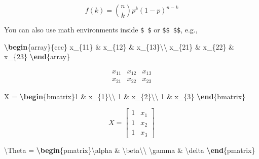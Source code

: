 \documentclass[
  12pt,
]{krantz}
\newenvironment{Shaded}{\begin{snugshade}}{\end{snugshade}}
\newcommand{\ExtensionTok}[1]{#1}
\newcommand{\KeywordTok}[1]{\textcolor[rgb]{0.13,0.29,0.53}{\textbf{#1}}}
\newcommand{\NormalTok}[1]{#1}
\newcommand{\SpecialCharTok}[1]{\textcolor[rgb]{0.00,0.00,0.00}{#1}}
\newcommand{\SpecialStringTok}[1]{\textcolor[rgb]{0.31,0.60,0.02}{#1}}
\theoremstyle{definition}
\theoremstyle{definition}
\theoremstyle{definition}
\theoremstyle{definition}
\theoremstyle{remark}
\begin{document}
\[f\left(k\right)=\binom{n}{k}p^k\left(1-p\right)^{n-k}\]

You can also use math environments inside \texttt{\$\ \$} or \texttt{\$\$\ \$\$}, e.g.,

\begin{Shaded}
\begin{Highlighting}[]
\SpecialStringTok{$$}\KeywordTok{\textbackslash{}begin}\NormalTok{\{}\ExtensionTok{array}\NormalTok{\}}\SpecialStringTok{\{ccc\}}
\SpecialStringTok{x\_\{11\} \& x\_\{12\} \& x\_\{13\}}\SpecialCharTok{\textbackslash{}\textbackslash{}}
\SpecialStringTok{x\_\{21\} \& x\_\{22\} \& x\_\{23\}}
\KeywordTok{\textbackslash{}end}\NormalTok{\{}\ExtensionTok{array}\NormalTok{\}}\SpecialStringTok{$$}
\end{Highlighting}
\end{Shaded}

\[\begin{array}{ccc}
x_{11} & x_{12} & x_{13}\\
x_{21} & x_{22} & x_{23}
\end{array}\]

\begin{Shaded}
\begin{Highlighting}[]
\SpecialStringTok{$$X = }\KeywordTok{\textbackslash{}begin}\NormalTok{\{}\ExtensionTok{bmatrix}\NormalTok{\}}\SpecialStringTok{1 \& x\_\{1\}}\SpecialCharTok{\textbackslash{}\textbackslash{}}
\SpecialStringTok{1 \& x\_\{2\}}\SpecialCharTok{\textbackslash{}\textbackslash{}}
\SpecialStringTok{1 \& x\_\{3\}}
\KeywordTok{\textbackslash{}end}\NormalTok{\{}\ExtensionTok{bmatrix}\NormalTok{\}}\SpecialStringTok{$$}
\end{Highlighting}
\end{Shaded}

\[X = \begin{bmatrix}1 & x_{1}\\
1 & x_{2}\\
1 & x_{3}
\end{bmatrix}\]

\begin{Shaded}
\begin{Highlighting}[]
\SpecialStringTok{$$}\SpecialCharTok{\textbackslash{}Theta}\SpecialStringTok{ = }\KeywordTok{\textbackslash{}begin}\NormalTok{\{}\ExtensionTok{pmatrix}\NormalTok{\}}\SpecialCharTok{\textbackslash{}alpha}\SpecialStringTok{ \& }\SpecialCharTok{\textbackslash{}beta\textbackslash{}\textbackslash{}}
\SpecialCharTok{\textbackslash{}gamma}\SpecialStringTok{ \& }\SpecialCharTok{\textbackslash{}delta}
\KeywordTok{\textbackslash{}end}\NormalTok{\{}\ExtensionTok{pmatrix}\NormalTok{\}}\SpecialStringTok{$$}
\end{Highlighting}
\end{Shaded}
\end{document}
